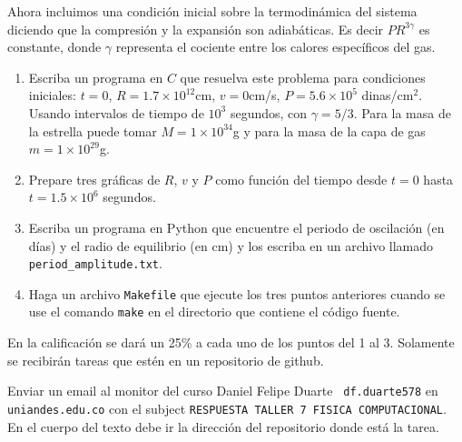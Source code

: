 \documentclass{article}
\begin{document}
Ahora incluimos una condici\'on inicial sobre la termodin\'amica del
sistema diciendo que la compresi\'on y la expansi\'on son
adiab\'aticas. Es decir $PR^{3\gamma}$ es constante, donde $\gamma$
representa el cociente entre los calores espec\'ificos del gas.


\begin{enumerate}
\item 
Escriba un programa en $C$ que resuelva este problema para condiciones
iniciales: $t=0$, $R=1.7\times 10^{12}$cm, $v=0$cm/s, $P=5.6\times
10^{5}$ dinas/cm$^2$. Usando intervalos de tiempo de $10^3$ segundos,
con $\gamma=5/3$. Para la masa de la estrella puede tomar $M = 1\times
10^{34}$g y para la masa de la capa de gas $m=1\times 10^{29}$g.

\item
Prepare tres gr\'aficas de $R$, $v$ y $P$ como funci\'on del tiempo
desde $t=0$ hasta $t=1.5\times 10^{6}$ segundos.

\item 
Escriba un programa en Python que encuentre el periodo de oscilaci\'on (en
d\'ias) y el radio de equilibrio (en cm) y los escriba en un archivo
llamado \verb"period_amplitude.txt".

\item 
Haga un archivo \verb"Makefile" que ejecute los tres puntos anteriores
cuando se use el comando \verb"make" en el directorio que contiene el
c\'odigo fuente.   
\end{enumerate}

En la calificaci\'on se dar\'a un 25\% a cada uno de los puntos del 1
al 3. Solamente se recibir\'an tareas que est\'en en un repositorio de
github. 

Enviar un email al monitor del curso Daniel Felipe Duarte {\tt
  df.duarte578} en {\tt uniandes.edu.co} con el subject
\verb"RESPUESTA TALLER 7 FISICA COMPUTACIONAL". En el cuerpo del texto
debe ir la direcci\'on del repositorio donde est\'a la tarea. 
\end{document}
